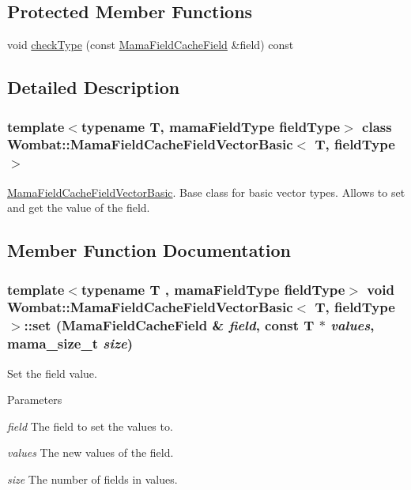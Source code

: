 \subsection*{Protected Member Functions}
\begin{DoxyCompactItemize}
\item 
void \hyperlink{classWombat_1_1MamaFieldCacheFieldVectorBasic_a588126cf850857ebd49ccb66138ca4ab}{checkType} (const \hyperlink{classWombat_1_1MamaFieldCacheField}{MamaFieldCacheField} \&field) const 
\end{DoxyCompactItemize}


\subsection{Detailed Description}
\subsubsection*{template$<$typename T, mamaFieldType fieldType$>$ class Wombat::MamaFieldCacheFieldVectorBasic$<$ T, fieldType $>$}

\hyperlink{classWombat_1_1MamaFieldCacheFieldVectorBasic}{MamaFieldCacheFieldVectorBasic}. Base class for basic vector types. Allows to set and get the value of the field. 

\subsection{Member Function Documentation}
\hypertarget{classWombat_1_1MamaFieldCacheFieldVectorBasic_a21c8322f02e29983948fbb406e027c58}{
\subsubsection[{set}]{\setlength{\rightskip}{0pt plus 5cm}template$<$typename T , mamaFieldType fieldType$>$ void {\bf Wombat::MamaFieldCacheFieldVectorBasic}$<$ T, fieldType $>$::set ({\bf MamaFieldCacheField} \& {\em field}, \/  const T $\ast$ {\em values}, \/  {\bf mama\_\-size\_\-t} {\em size})}}
\label{classWombat_1_1MamaFieldCacheFieldVectorBasic_a21c8322f02e29983948fbb406e027c58}


Set the field value. 
\begin{DoxyParams}{Parameters}
\item[{\em field}]The field to set the values to. \item[{\em values}]The new values of the field. \item[{\em size}]The number of fields in {\ttfamily values}. \end{DoxyParams}


